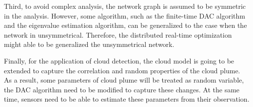 Third, to avoid complex analysis, the network graph is assumed to
be symmetric in the analysis. However, some algorithm, such as the
finite-time DAC algorithm and the eigenvalue estimation algorithm,
can be generalized to the case when the network in unsymmetrical.
Therefore, the distributed real-time optimization might able to be
generalized the unsymmetrical network. 

Finally, for the application of cloud detection, the cloud model is
going to be extended to capture the correlation and random properties
of the cloud plume. As a result, some parameters of cloud plume will
be treated as random variable, the DAC algorithm need to be modified
to capture these changes.  At the same time, sensors need to be able
to estimate these parameters from their observation. 
